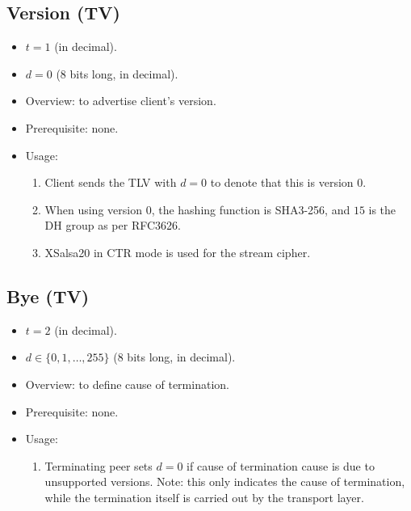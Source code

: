 \documentclass{article}
\begin{document}
\subsection{Version (TV)}
\begin{itemize}
    \item $t = 1$ (in decimal).
    \item $d = 0$ (8 bits long, in decimal).
    \item Overview: to advertise client's version. 
    \item Prerequisite: none.
    \item Usage:
        \begin{enumerate}
            \item Client sends the TLV with $d=0$ to denote that this is
            version 0.
            \item When using version $0$, the hashing function is SHA3-256, and
            $15$ is the DH group as per RFC3626.
            \item XSalsa20 in CTR mode is used for the stream cipher.
        \end{enumerate}
\end{itemize}

\subsection{Bye (TV)}
\begin{itemize}
    \item $t = 2$ (in decimal).
    \item $d \in \{0,1,\ldots,255\}$ (8 bits long, in decimal).
    \item Overview: to define cause of termination. 
    \item Prerequisite: none.
    \item Usage:
        \begin{enumerate}
            \item Terminating peer sets $d=0$ if cause of termination cause is
            due to unsupported versions. Note: this only indicates the cause of
            termination, while the termination itself is carried out by the
            transport layer.
        \end{enumerate}
\end{itemize}
\end{document}
